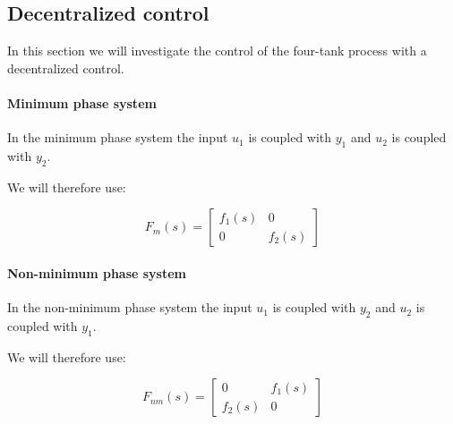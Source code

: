 \subsection{Decentralized control}

In this section we will investigate the control of the four-tank process with a decentralized control. 

\paragraph{Minimum phase system}

In the minimum phase system the input $u_1$ is coupled with $y_1$ and $u_2$ is coupled with $y_2$. 

We will therefore use:

$$F_m(s) = \left[\begin{array}{cc} f_1(s) & 0 \\ 0 & f_2(s) \end{array}\right]$$

\paragraph{Non-minimum phase system}

In the non-minimum phase system the input $u_1$ is coupled with $y_2$ and $u_2$ is coupled with $y_1$. 

We will therefore use:

$$F_{nm}(s) = \left[\begin{array}{cc} 0 & f_1(s) \\ f_2(s) & 0 \end{array}\right]$$


% 
% 
% 
